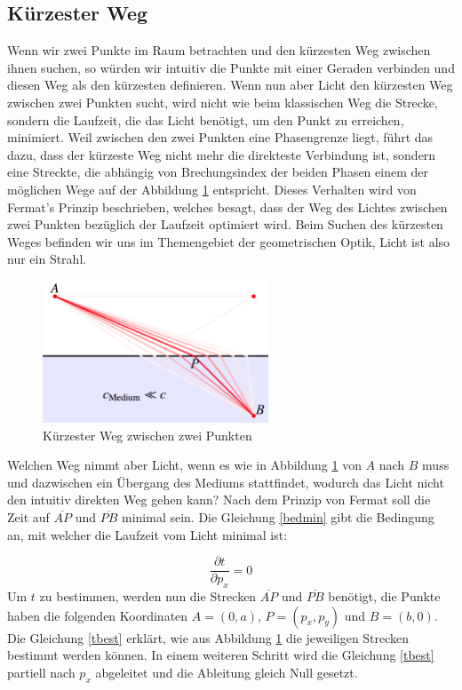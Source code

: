 \begin{refsection}
\section{Kürzester Weg}
Wenn wir zwei Punkte im Raum betrachten und den kürzesten Weg zwischen ihnen suchen, so würden wir intuitiv die Punkte mit einer Geraden verbinden und diesen Weg als den kürzesten definieren. Wenn nun aber Licht den kürzesten Weg zwischen zwei Punkten sucht, wird nicht wie beim klassischen Weg die Strecke, sondern die Laufzeit, die das Licht benötigt, um den Punkt zu erreichen, minimiert. Weil zwischen den zwei Punkten eine Phasengrenze liegt, führt das dazu, dass der kürzeste Weg nicht mehr die direkteste Verbindung ist, sondern eine Streckte, die abhängig von Brechungsindex der beiden Phasen einem der möglichen Wege auf der Abbildung \ref{fig:weg} entspricht. Dieses Verhalten wird von Fermat's Prinzip beschrieben, welches besagt, dass der Weg des Lichtes zwischen zwei Punkten bezüglich der Laufzeit optimiert wird. Beim Suchen des kürzesten Weges befinden wir uns im Themengebiet der geometrischen Optik, Licht ist also nur ein Strahl. 
\begin{figure}
  \centering
  \includegraphics[width=0.6\textwidth]{adaptiv/images/Weg}
  \caption{Kürzester Weg zwischen zwei Punkten}
  \label{fig:weg}
\end{figure}
Welchen Weg nimmt aber Licht, wenn es wie in Abbildung \ref{fig:weg} von $A$ nach $B$ muss und dazwischen ein Übergang des Mediums stattfindet, wodurch das Licht nicht den intuitiv direkten Weg gehen kann? Nach dem Prinzip von Fermat soll die Zeit auf $\overline{AP}$ und $\overline{PB}$ minimal sein. Die Gleichung \eqref{bedmin} gibt die Bedingung an, mit welcher die Laufzeit vom Licht minimal ist:

\begin{equation}\label{bedmin}
\dfrac{\partial t}{\partial p_{x}}=0
\end{equation}
Um $t$ zu bestimmen, werden nun die Strecken $\overline{AP}$ und $\overline{PB}$ benötigt, die Punkte haben die folgenden Koordinaten $A = (0,a)$, $P=(p_{x},p_{y})$ und $B=(b,0)$. Die Gleichung \eqref{tbest} erklärt, wie aus Abbildung \ref{fig:weg} die jeweiligen Strecken bestimmt werden können. In einem weiteren Schritt wird die Gleichung \eqref{tbest} partiell nach $p_{x}$ abgeleitet und die Ableitung gleich Null gesetzt.


\end{refsection}
